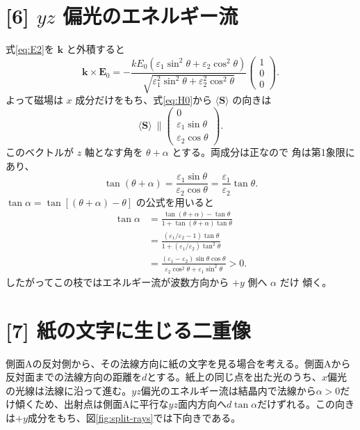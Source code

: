 \documentclass[11pt,a4paper]{article}
\begin{document}
\section*{[6] $yz$ 偏光のエネルギー流}
式\eqref{eq:E2}を $\boldsymbol{k}$ と外積すると
\begin{equation}
 \boldsymbol{k}\times\boldsymbol{E}_0
 =-\frac{kE_0(\varepsilon_1\sin^2\theta+
                      \varepsilon_2\cos^2\theta)}
        {\sqrt{\varepsilon_1^2\sin^2\theta+
                      \varepsilon_2^2\cos^2\theta}}
 \begin{pmatrix}1\\0\\0\end{pmatrix}.
\end{equation}
よって磁場は $x$ 成分だけをもち、式\eqref{eq:H0}から
$\langle\boldsymbol{S}\rangle$ の向きは
\begin{equation}
 \langle\boldsymbol{S}\rangle\ \parallel
 \begin{pmatrix}0\\\varepsilon_1\sin\theta\\
                       \varepsilon_2\cos\theta\end{pmatrix}.
 \label{eq:S2}
\end{equation}
このベクトルが $z$ 軸となす角を $\theta+\alpha$ とする。両成分は正なので
角は第1象限にあり、
\begin{equation}
 \tan(\theta+\alpha)=
 \frac{\varepsilon_1\sin\theta}{\varepsilon_2\cos\theta}
 =\frac{\varepsilon_1}{\varepsilon_2}\tan\theta.
 \label{eq:sum-angle}
\end{equation}
$\tan\alpha=\tan[(\theta+\alpha)-\theta]$ の公式を用いると
\begin{align}
 \tan\alpha
 &=\frac{\tan(\theta+\alpha)-\tan\theta}
         {1+\tan(\theta+\alpha)\tan\theta}\\
 &=\frac{(\varepsilon_1/\varepsilon_2-1)\tan\theta}
         {1+(\varepsilon_1/\varepsilon_2)\tan^2\theta}\\
 &=\frac{(\varepsilon_1-\varepsilon_2)\sin\theta\cos\theta}
         {\varepsilon_2\cos^2\theta+\varepsilon_1\sin^2\theta}>0.
 \label{eq:alpha}
\end{align}
したがってこの枝ではエネルギー流が波数方向から $+y$ 側へ $\alpha$ だけ
傾く。

\section*{[7] 紙の文字に生じる二重像}
側面Aの反対側から、その法線方向に紙の文字を見る場合を考える。側面Aから反対面までの法線方向の距離を$d$とする。紙上の同じ点を出た光のうち、$x$偏光の光線は法線に沿って進む。$yz$偏光のエネルギー流は結晶内で法線から$\alpha>0$だけ傾くため、出射点は側面Aに平行な$yz$面内方向へ$d\tan\alpha$だけずれる。この向きは$+y$成分をもち、図\ref{fig:split-rays}では下向きである。
\end{document}
